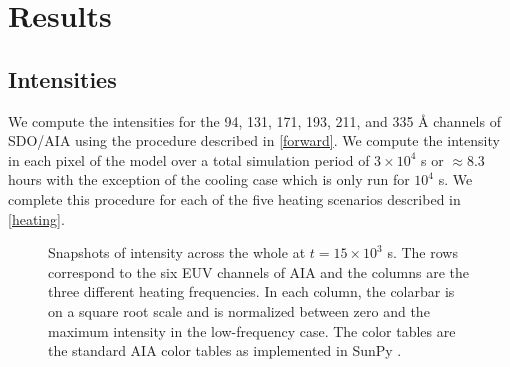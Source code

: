 \section{Results}\label{results}


\subsection{Intensities}

We compute the intensities for the 94, 131, 171, 193, 211, and 335 \AA{} channels of SDO/AIA using the procedure described in \autoref{forward}. We compute the intensity in each pixel of the model \AR{} over a total simulation period of $3\times10^4$ s or $\approx8.3$ hours with the exception of the cooling case which is only run for $10^4$ s. We complete this procedure for each of the five heating scenarios described in \autoref{heating}. 

\begin{figure*}
    \caption{Snapshots of intensity across the whole \AR{} at $t=15\times10^3$ s. The rows correspond to the six EUV channels of AIA and the columns are the three different heating frequencies. In each column, the colarbar is on a square root scale and is normalized between zero and the maximum intensity in the low-frequency case. The color tables are the standard AIA color tables as implemented in SunPy \citep{sunpy_community_sunpypython_2015}.}
    \label{fig:intensity_map}
\end{figure*}

